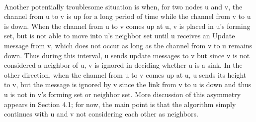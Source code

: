 \paragraph{}Another potentially troublesome situation is when, for two nodes u and v, the channel from u to v is up for a long period of time while the channel from v to u is down. When the channel from u to v comes up at u, v is placed in u’s forming set, but is not able to move into u’s neighbor set until u receives an Update message from v, which does not occur as long as the channel from v to u remains down. Thus during this interval, u sends update messages to v but since v is not considered a neighbor of u, v is ignored in deciding whether u is a sink. In the other direction, when the channel from u to v comes up at u, u sends its height to v, but the message is ignored by v since the link from v to u is down and thus u is not in v’s forming set or neighbor set. More discussion of this asymmetry appears in Section 4.1; for now, the main point is that the algorithm simply continues with u and v not considering each other as neighbors.
